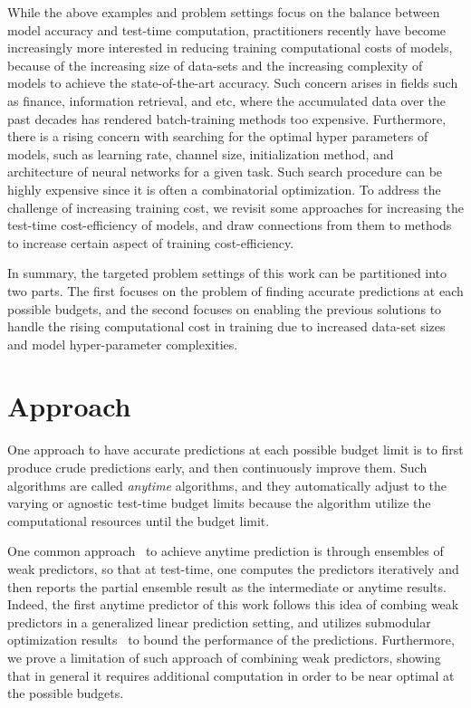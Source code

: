 While the above examples and problem settings focus on the balance between model accuracy and test-time computation, practitioners recently have become increasingly more interested in reducing training computational costs of models, because of the increasing size of data-sets and the increasing complexity of models to achieve the state-of-the-art accuracy. Such concern arises in fields such as finance, information retrieval, and etc, where the accumulated data over the past decades has rendered batch-training methods too expensive. Furthermore, there is a rising concern with searching for the optimal hyper parameters of models, such as learning rate, channel size, initialization method, and architecture of neural networks for a given task. 
Such search procedure can be highly expensive since it is often a combinatorial optimization. 
To address the challenge of increasing training cost, we revisit some approaches for increasing the test-time cost-efficiency of models, and draw connections from them to methods to increase certain aspect of training cost-efficiency. 

In summary, the targeted problem settings of this work can be partitioned into two parts. The first focuses on the problem of finding accurate predictions at each possible budgets, and the second focuses on enabling the previous solutions to handle the rising computational cost in training due to increased data-set sizes and model hyper-parameter complexities. 

\section{Approach}


One approach to have accurate predictions at each possible budget limit is to first produce crude predictions early, and then continuously improve them. Such algorithms are called \emph{anytime} algorithms, and they automatically adjust to the varying or agnostic test-time budget limits because the algorithm utilize the computational resources until the budget limit. 

One common approach~\citep{speedboost} to achieve anytime prediction is through ensembles of weak predictors, so that at test-time, one computes the predictors iteratively and then reports the partial ensemble result as the intermediate or anytime results. Indeed, the first anytime predictor of this work follows this idea of combing weak predictors in a generalized linear prediction setting, and utilizes submodular optimization results~\citep{kemp} to bound the performance of the predictions. Furthermore, we prove a limitation of such approach of combining weak predictors, showing that in general it requires additional computation in order to be near optimal at the possible budgets. 

